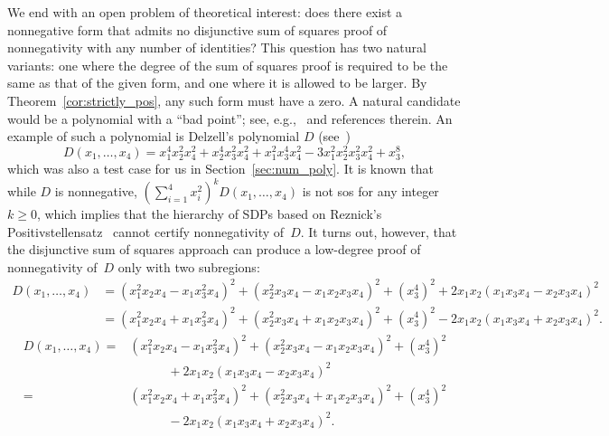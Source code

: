 \documentclass[12pt]{article}
\theoremstyle{remark}
\begin{document}
{We end with an open problem of theoretical interest: does there exist a nonnegative form that admits no disjunctive sum of squares proof of nonnegativity with any number of identities? This question has two natural variants: one where the degree of the sum of squares proof is required to be the same as {that of} the given form, and one where it is allowed to be larger. By Theorem~\ref{cor:strictly_pos}, any such form must have a zero.
A natural candidate would be a polynomial with a {``bad point''}; see, e.g.,~\cite{Reznick2005, Benoist2021} and references therein. 
An example of such a polynomial is Delzell's polynomial $D$ (see~\cite{Delzell1980})
$$D(x_1,\ldots,x_4)=x_1^4x_2^2x_4^2+x_2^4x_3^2x_4^2+x_1^2x_3^4x_4^2-3x_1^2x_2^2x_3^2x_4^2+x_3^{8},$$
which was also a test case for us in Section~\ref{sec:num_poly}. It is known that while $D$ is nonnegative, $\left(\sum_{i=1}^4 x_i^2\right)^k D(x_1,\ldots,x_4)$ is not sos for any integer $k \ge 0$, which implies that the hierarchy of SDPs based on Reznick's Positivstellensatz~\cite{reznick1995uniform} cannot certify nonnegativity of~$D$. 
It turns out, however, that the disjunctive sum of squares approach can produce a low-degree proof of nonnegativity of~$D$ only with two subregions: 
\ifpreprint
\[
\begin{aligned}
D(x_1,\ldots,x_4) &= (x_1^2x_2x_4 - x_1x_3^2x_4)^2 + (x_2^2x_3x_4 - x_1x_2x_3x_4)^2 + (x_3^4)^2 + 2x_1x_2(x_1x_3x_4-x_2x_3x_4)^2\\
    & = (x_1^2x_2x_4 + x_1x_3^2x_4)^2 + (x_2^2x_3x_4 + x_1x_2x_3x_4)^2 + (x_3^4)^2 - 2x_1x_2(x_1x_3x_4+x_2x_3x_4)^2.
    \end{aligned}
\]
\else
\[
\begin{aligned}
D(x_1,\ldots,x_4) ={}& (x_1^2x_2x_4 - x_1x_3^2x_4)^2 + (x_2^2x_3x_4 - x_1x_2x_3x_4)^2 + (x_3^4)^2\\
		     &\hspace{3em} + 2x_1x_2(x_1x_3x_4-x_2x_3x_4)^2\\
    ={}& (x_1^2x_2x_4 + x_1x_3^2x_4)^2 + (x_2^2x_3x_4 + x_1x_2x_3x_4)^2 + (x_3^4)^2\\
       &\hspace{3em} - 2x_1x_2(x_1x_3x_4+x_2x_3x_4)^2.
    \end{aligned}
\]
\fi
}
\end{document}
